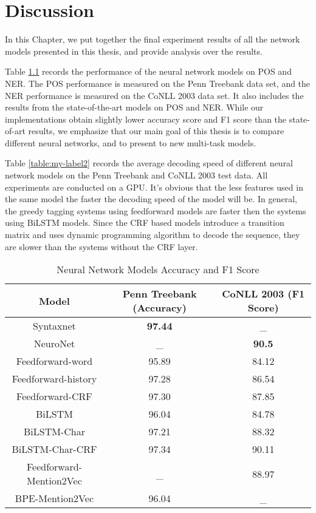 \chapter{Discussion}

In this Chapter, we put together the final experiment results of all the network models presented in this thesis, and provide analysis over the results.

Table \ref{table:my-label1} records the performance of the neural network models on POS and NER. The POS performance is measured on the Penn Treebank data set, and the NER performance is measured on the CoNLL 2003 data set. It also includes the results from the state-of-the-art models on POS and NER. While our implementations obtain slightly lower accuracy score and F1 score than the state-of-art results, we emphasize that our main goal of this thesis is to compare different neural networks, and to present to new multi-task models.

Table \ref{table:my-label2} records the average decoding speed of different neural network models on the Penn Treebank and CoNLL 2003 test data. All experiments are conducted on a GPU. It's obvious that the less features used in the same model the faster the decoding speed of the model will be. In general, the greedy tagging systems using feedforward models are faster then the systems using BiLSTM models. Since the CRF based models introduce a transition matrix and uses dynamic programming algorithm to decode the sequence, they are slower than the systems without the CRF layer.

\begin{table}[]
\centering
\caption{Neural Network Models Accuracy and F1 Score}
\label{table:my-label1}
\begin{tabular}{|c|c|c|}
\hline
Model         & Penn Treebank (Accuracy)  & CoNLL 2003 (F1 Score)       \\ \hline
Syntaxnet    & \textbf{97.44}         &   _     \\ \hline
NeuroNet    & _    & \textbf{90.5}                \\ \hline 
Feedforward-word    & 95.89          &   84.12     \\ \hline
Feedforward-history & 97.28     & 86.54        \\ \hline
Feedforward-CRF     & 97.30          &   87.85     \\ \hline
BiLSTM  & 96.04     & 84.78                             \\ \hline
BiLSTM-Char & 97.21 & 88.32             \\ \hline
BiLSTM-Char-CRF & 97.34  & 90.11             \\ \hline
Feedforward-Mention2Vec  & _    & 88.97                       \\ \hline
BPE-Mention2Vec & 96.04     &  _   \\ \hline   
\end{tabular}
\end{table}

